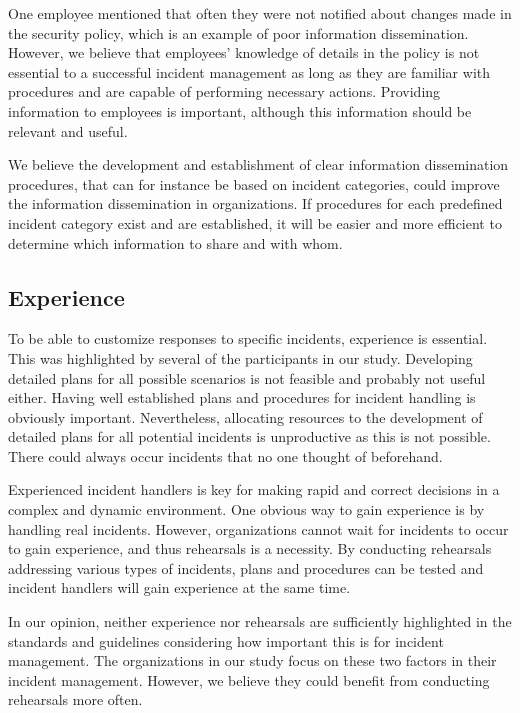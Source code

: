 One employee mentioned that often they were not notified about changes made in the security policy, which is an example of poor information dissemination. However, we believe that employees' knowledge of details in the policy is not essential to a successful incident management as long as they are familiar with procedures and are capable of performing necessary actions. Providing information to employees is important, although this information should be relevant and useful.

We believe the development and establishment of clear information dissemination procedures, that can for instance be based on incident categories, could improve the information dissemination in organizations. If procedures for each predefined incident category exist and are established, it will be easier and more efficient to determine which information to share and with whom.

\subsection{Experience}
\label{sec:experience}
To be able to customize responses to specific incidents, experience is essential. This was highlighted by several of the participants in our study. Developing detailed plans for all possible scenarios is not feasible and probably not useful either. Having well established plans and procedures for incident handling is obviously important. Nevertheless, allocating resources to the development of detailed plans for all potential incidents is unproductive as this is not possible. There could always occur incidents that no one thought of beforehand. 

Experienced incident handlers is key for making rapid and correct decisions in a complex and dynamic environment. One obvious way to gain experience is by handling real incidents. However, organizations cannot wait for incidents to occur to gain experience, and thus rehearsals is a necessity. By conducting rehearsals addressing various types of incidents, plans and procedures can be tested and incident handlers will gain experience at the same time. 

In our opinion, neither experience nor rehearsals are sufficiently highlighted in the standards and guidelines considering how important this is for incident management. The organizations in our study focus on these two factors in their incident management. However, we believe they could benefit from conducting rehearsals more often.

